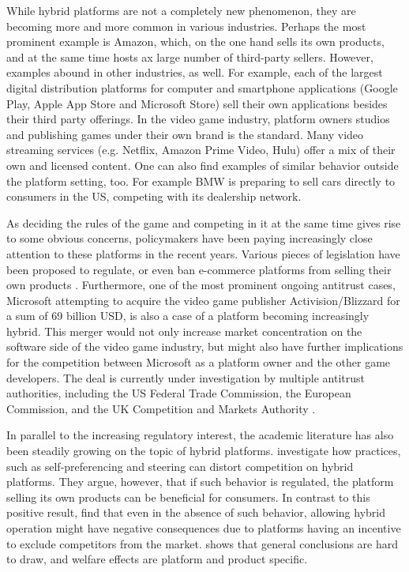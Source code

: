 \documentclass[a4paper]{article}
\begin{document}
While hybrid platforms are not a completely new phenomenon, they are becoming more and more common in various industries.
Perhaps the most prominent example is Amazon, which, on the one hand sells its own products, and at the same time hosts ax large number of third-party sellers.
However, examples abound in other industries, as well.
For example, each of the largest digital distribution platforms for computer and smartphone applications (Google Play, Apple App Store and Microsoft Store) sell their own applications besides their third party offerings.
In the video game industry, platform owners studios and publishing games under their own brand is the standard.
Many video streaming services (e.g. Netflix, Amazon Prime Video, Hulu) offer a mix of their own and licensed content.
One can also find examples of similar behavior outside the platform setting, too.
For example BMW is preparing to sell cars directly to consumers in the US, competing with its dealership network.

As deciding the rules of the game and competing in it at the same time gives rise to some obvious concerns, policymakers have been paying increasingly close attention to these platforms in the recent years.
Various pieces of legislation have been proposed to regulate, or even ban e-commerce platforms from selling their own products \parencite[][]{phartiyal_2019,reynolds_2022,eu-2022}.
Furthermore, one of the most prominent ongoing antitrust cases, Microsoft attempting to acquire the video game publisher Activision/Blizzard for a sum of 69 billion USD, is also a case of a platform becoming increasingly hybrid.
This merger would not only increase market concentration on the software side of the video game industry, but might also have further implications for the competition between Microsoft as a platform owner and the other game developers.
The deal is currently under investigation by multiple antitrust authorities, including the US Federal Trade Commission, the European Commission, and the UK Competition and Markets Authority \parencite{livni_merced_2023}.

In parallel to the increasing regulatory interest, the academic literature has also been steadily growing on the topic of hybrid platforms.
\textcite{hagiu2022should} investigate how practices, such as self-preferencing and steering can distort competition on hybrid platforms.
They argue, however, that if such behavior is regulated, the platform selling its own products can be beneficial for consumers.
In contrast to this positive result, \textcite[]{anderson2021hybrid} find that even in the absence of such behavior, allowing hybrid operation might have negative consequences due to platforms having an incentive to exclude competitors from the market.
\textcite[]{gutierrez2021welfare} shows that general conclusions are hard to draw, and welfare effects are platform and product specific.
\end{document}
